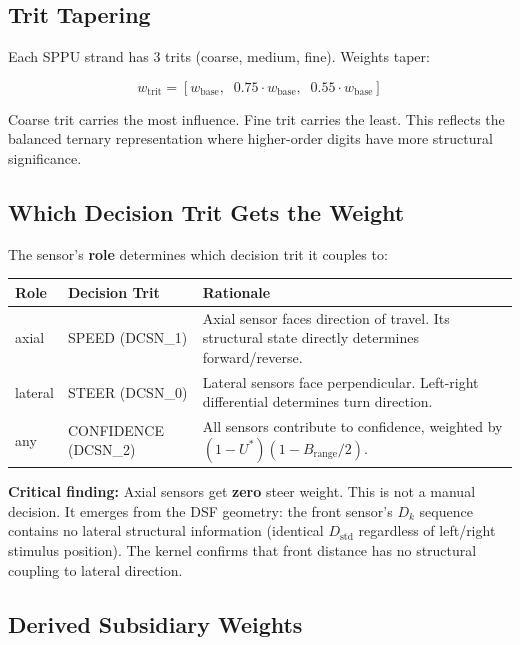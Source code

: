 \documentclass[11pt,a4paper]{article}
\begin{document}
\subsection{Trit Tapering}

Each SPPU strand has 3 trits (coarse, medium, fine). Weights taper:

\begin{equation}
w_{\text{trit}} = [w_{\text{base}},\;\; 0.75 \cdot w_{\text{base}},\;\; 0.55 \cdot w_{\text{base}}]
\end{equation}

Coarse trit carries the most influence. Fine trit carries the least.
This reflects the balanced ternary representation where higher-order
digits have more structural significance.

\subsection{Which Decision Trit Gets the Weight}

The sensor's \textbf{role} determines which decision trit it couples to:

\begin{center}
\begin{tabular}{@{}llp{7cm}@{}}
\toprule
\textbf{Role} & \textbf{Decision Trit} & \textbf{Rationale} \\
\midrule
axial & SPEED (DCSN\_1) & Axial sensor faces direction of travel. Its structural state directly determines forward/reverse. \\
lateral & STEER (DCSN\_0) & Lateral sensors face perpendicular. Left-right differential determines turn direction. \\
any & CONFIDENCE (DCSN\_2) & All sensors contribute to confidence, weighted by $(1 - U^*)(1 - B_{\text{range}}/2)$. \\
\bottomrule
\end{tabular}
\end{center}

\textbf{Critical finding:} Axial sensors get \textbf{zero} steer weight.
This is not a manual decision. It emerges from the DSF geometry: the
front sensor's $D_k$ sequence contains no lateral structural information
(identical $D_{\text{std}}$ regardless of left/right stimulus position).
The kernel confirms that front distance has no structural coupling to
lateral direction.

\subsection{Derived Subsidiary Weights}
\end{document}
